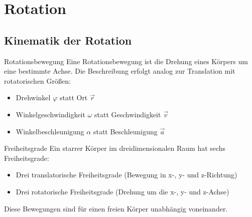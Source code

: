 \section{Rotation}

\subsection{Kinematik der Rotation}

\begin{definition}{Rotationsbewegung}
    Eine Rotationsbewegung ist die Drehung eines Körpers um eine bestimmte Achse. Die Beschreibung erfolgt analog zur Translation mit rotatorischen Größen:
    \begin{itemize}
        \item Drehwinkel $\varphi$ statt Ort $\vec{r}$
        \item Winkelgeschwindigkeit $\omega$ statt Geschwindigkeit $\vec{v}$
        \item Winkelbeschleunigung $\alpha$ statt Beschleunigung $\vec{a}$
    \end{itemize}
\end{definition}

\begin{concept}{Freiheitsgrade}
    Ein starrer Körper im dreidimensionalen Raum hat sechs Freiheitsgrade:
    \begin{itemize}
        \item Drei translatorische Freiheitsgrade (Bewegung in x-, y- und z-Richtung)
        \item Drei rotatorische Freiheitsgrade (Drehung um die x-, y- und z-Achse)
    \end{itemize}
    Diese Bewegungen sind für einen freien Körper unabhängig voneinander.
\end{concept}

